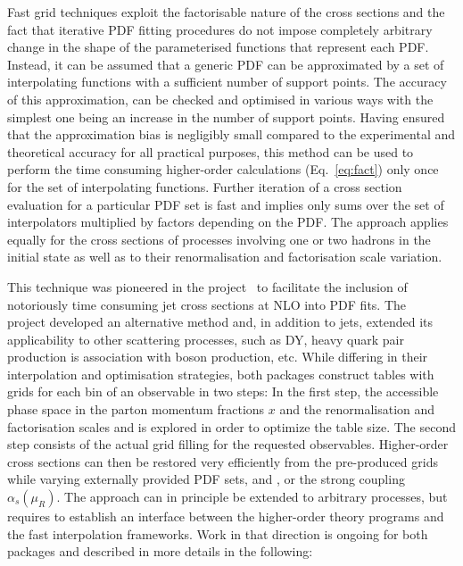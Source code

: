   Fast grid techniques exploit the factorisable nature of the cross sections and 
  the fact that iterative PDF fitting
  procedures do not impose completely arbitrary change in the shape
  of the parameterised functions that represent each PDF\@.
  Instead, it can be assumed that a generic PDF can be approximated by
  a set of interpolating functions with a sufficient number of
support points. The 
  accuracy of this approximation, can be checked and optimised 
  in various ways with the simplest one being an increase in the number of
  support points. Having ensured that the approximation bias
  is negligibly
  small compared to the experimental and theoretical accuracy 
  for all practical purposes, this method can be used to perform
  the time consuming higher-order calculations (Eq.~\ref{eq:fact})
  only once for the set of interpolating functions. 
  Further iteration of a cross section evaluation for
  a particular PDF set is fast and implies only sums over
  the set of interpolators multiplied by factors depending on the
  PDF\@. The approach applies equally 
  for the cross sections of
  processes involving one or two hadrons in the initial state as well
  as to their renormalisation and factorisation scale variation.

  This technique was pioneered in the \fastnlo
  project~\cite{Kluge:2006xs} to facilitate the inclusion of
  notoriously time consuming jet cross sections at NLO into PDF fits.
  The \applgrid~\cite{Carli:2010rw} project developed an alternative method
  and, in addition to jets, extended its applicability to other scattering processes, 
  such as DY, heavy quark pair production is association with boson production, etc.
  While differing in their interpolation
  and optimisation strategies, both packages construct tables with
  grids for each bin of an observable in two steps: In the first step,
  the accessible phase space in the parton momentum fractions $x$ and
  the renormalisation and factorisation scales \mur and \muf is
  explored in order to optimize the table size. The second step
  consists of the actual grid filling for the
  requested observables. Higher-order cross sections can then be
  restored very efficiently from the pre-produced grids while varying
  externally provided PDF sets, \mur and \muf, or the strong coupling
  $\alpha_s(\mu_R)$. The approach can in principle be extended to arbitrary
  processes, but requires to establish an interface between the
  higher-order theory programs and the fast interpolation
  frameworks. Work in that direction is ongoing for both packages
  and described in more details in the following:

